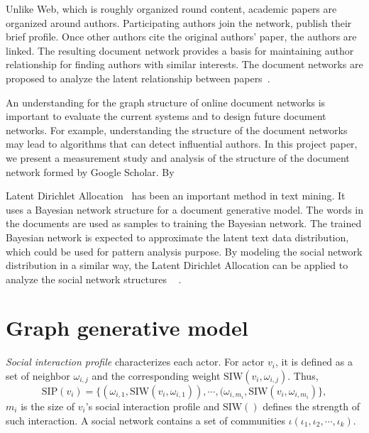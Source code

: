 \documentclass[letterpaper]{article}
\begin{document}
Unlike Web, which is roughly organized round content, academic papers are organized around authors.
Participating authors join the network, publish their brief profile.
Once other authors cite the original authors’ paper, the authors are linked.
The resulting document network provides a basis for maintaining author relationship for finding authors with similar interests.
The document networks are proposed to analyze the latent relationship between papers~\cite{chang2009relational}.

An understanding for the graph structure of online document networks is important to evaluate the current systems and to design future document networks. 
For example, understanding the structure of the document networks may lead to algorithms that can detect influential authors.
In this project paper, we present a measurement study and analysis of the structure of the document network formed by Google Scholar. 
By

Latent Dirichlet Allocation~\cite{Blei:2003:LDA:944919.944937} has been an important method in text mining.
It uses a Bayesian network structure for a document generative model.
The words in the documents are used as samples to training the Bayesian network.
The trained Bayesian network is expected to approximate the latent text data distribution, which could be used for pattern analysis purpose.
By modeling the social network distribution in a similar way, the Latent Dirichlet Allocation can be applied to analyze the social network structures
~\cite{4258697} \cite{Cha:2012:SAU:2348283.2348360} \cite{Henderson:2009:ALD:1529282.1529607}.

\section{Graph generative model}

\emph{Social interaction profile} characterizes each actor.
For actor $ v_{i} $, it is defined as a set of neighbor $ \omega_{i,j} $ and the corresponding weight $ \mbox{SIW}(v_{i}, \omega_{i,j}) $.
Thus,
\begin{equation}
\mbox{SIP}(v_{i}) = \{ (\omega_{i,1}, \mbox{SIW}(v_{i}, \omega_{i,1})) , \cdots , (\omega_{i,m_{i}}, \mbox{SIW}(v_{i}, \omega_{i,m_{i}}) \},
\end{equation}
$ m_{i} $ is the size of $ v_{i} $'s social interaction profile and $ \mbox{SIW}() $ defines the strength of such interaction.
A social network contains a set of communities $ \iota( \iota_{1} , \iota_{2} , \cdots , \iota_{k} ) $.
\end{document}

